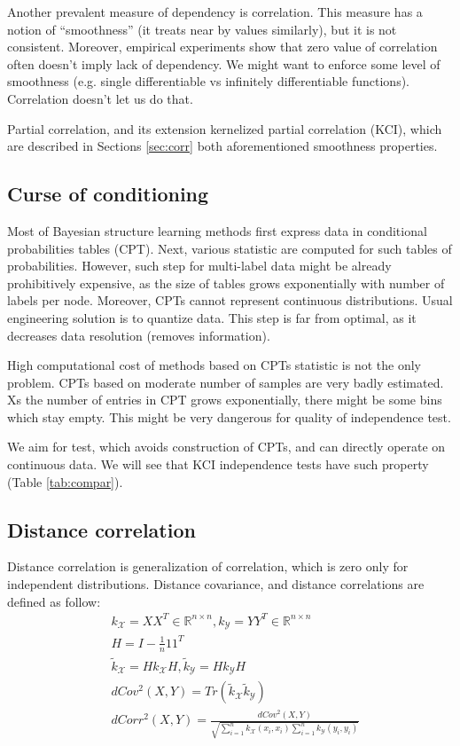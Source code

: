 \documentclass{article} %
\begin{document}
Another prevalent measure of dependency is correlation. This measure
has a notion of ``smoothness'' (it treats near by values similarly), but
it is not consistent. Moreover, empirical experiments show that zero value
of correlation often doesn't imply lack of dependency. We might want to 
enforce some level of smoothness (e.g. single differentiable vs infinitely 
differentiable functions). Correlation doesn't let us do that. 

Partial correlation, and its extension kernelized partial correlation (KCI), which are described 
in Sections \ref{sec:corr} both aforementioned smoothness properties.


\subsection{Curse of conditioning}\label{sec:curse}
Most of Bayesian structure learning methods first express data in conditional probabilities tables (CPT).
Next, various statistic are computed for such tables of probabilities. However, such step
for multi-label data might be already prohibitively expensive, as the size of tables grows
exponentially with number of labels per node. Moreover, CPTs cannot represent continuous
distributions. Usual engineering solution is to quantize data. This step is far from optimal,
as it decreases data resolution (removes information). 

High computational cost of methods based on CPTs statistic is not the only problem. 
CPTs based on moderate number of samples are very badly estimated. Xs the number
of entries in CPT grows exponentially, there might be some bins which stay empty. This might
be very dangerous for quality of independence test.

We aim for test, which avoids construction of CPTs, and can directly operate on continuous data.
We will see that KCI independence tests have such property (Table \ref{tab:compar}).

\subsection{Distance correlation}\label{sec:dist}
Distance correlation \cite{szekely2007measuring} is generalization of correlation, which is zero only for independent distributions.
Distance covariance, and distance correlations are defined as follow:
\begin{align*}
  &k_\mathcal{X} = XX^T \in \mathbb{R}^{n \times n},
  k_\mathcal{Y} = YY^T \in \mathbb{R}^{n \times n}\\
  &H = I - \frac{1}{n}11^T \\
  &\tilde{k}_\mathcal{X} = Hk_{\mathcal{X}}H, 
  \tilde{k}_\mathcal{Y} = Hk_{\mathcal{Y}}H \\
  &dCov^2(X, Y) = Tr(\tilde{k}_\mathcal{X}\tilde{k}_\mathcal{Y}) \\
  &dCorr^2(X, Y) = \frac{dCov^2(X, Y)}{\sqrt{\sum_{i=1}^nk_{\mathcal{X}}(x_i, x_i) \sum_{i=1}^nk_{\mathcal{Y}}(y_i, y_i)}} 
\end{align*}
\end{document}
